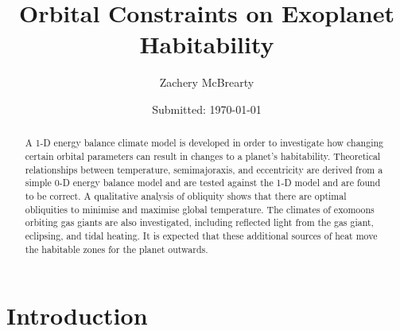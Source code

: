 \documentclass[12pt, onecolumn]{revtex4-2}    %
\begin{document}
\title{Orbital Constraints on Exoplanet Habitability}
\date{Submitted: \today{}}
\author{Zachery McBrearty}

\begin{abstract}

    A 1-D energy balance climate model is developed in order to investigate how changing certain orbital parameters can result in changes to a planet's habitability.
    Theoretical relationships between temperature, semimajoraxis, and eccentricity are derived from a simple 0-D energy balance model and are tested against the 1-D model and are found to be correct.
    A qualitative analysis of obliquity shows that there are optimal obliquities to minimise and maximise global temperature.
    The climates of exomoons orbiting gas giants are also investigated, including reflected light from the gas giant, eclipsing, and tidal heating.
    It is expected that these additional sources of heat move the habitable zones for the planet outwards.

\end{abstract}


\maketitle

\tableofcontents

\newpage

\section{Introduction} \label{sec:Introduction}


\end{document}
